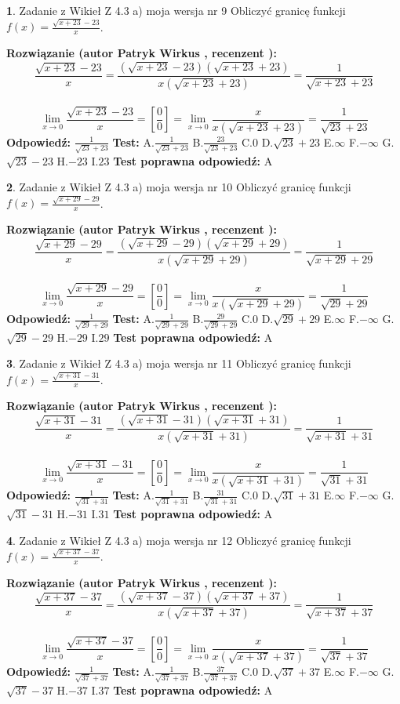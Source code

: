 \documentclass[12pt, a4paper]{article}
\theoremstyle{definition} %
\newtheorem{zad}{}
\newcommand{\zadStart}[1]{\begin{zad}#1\newline}
\newcommand{\zadStop}{\end{zad}}
\newcommand{\rozwStart}[2]{\noindent \textbf{Rozwiązanie (autor #1 , recenzent #2): }\newline}
\newcommand{\rozwStop}{\newline}
\newcommand{\odpStart}{\noindent \textbf{Odpowiedź:}\newline}
\newcommand{\odpStop}{\newline}
\newcommand{\testStart}{\noindent \textbf{Test:}\newline}
\newcommand{\testStop}{\newline}
\newcommand{\kluczStart}{\noindent \textbf{Test poprawna odpowiedź:}\newline}
\newcommand{\kluczStop}{\newline}
\begin{document}
\zadStart{Zadanie z Wikieł Z 4.3 a) moja wersja nr 9}
Obliczyć granicę funkcji $f(x)=\frac{\sqrt{x+23}-23}{x}$.
\zadStop
\rozwStart{Patryk Wirkus}{}
$$\frac{\sqrt{x+23}-23}{x}=\frac{(\sqrt{x+23}-23)(\sqrt{x+23}+23)}{x(\sqrt{x+23}+23)}=\frac{1}{\sqrt{x+23}+23}$$
\\
$$\lim\limits_{x\to0}\frac{\sqrt{x+23}-23}{x}=[\frac{0}{0}]=
\lim\limits_{x\to0}\frac{x}{x(\sqrt{x+23}+23)} = \frac{1}{\sqrt{23}+23}$$
\rozwStop
\odpStart
$\frac{1}{\sqrt{23}+23}$
\odpStop
\testStart
A.$\frac{1}{\sqrt{23}+23}$
B.$\frac{23}{\sqrt{23}+23}$
C.$0$
D.$\sqrt{23}+23$
E.$\infty$
F.$-\infty$
G.$\sqrt{23}-23$
H.$-23$
I.$23$
\testStop
\kluczStart
A
\kluczStop



\zadStart{Zadanie z Wikieł Z 4.3 a) moja wersja nr 10}
Obliczyć granicę funkcji $f(x)=\frac{\sqrt{x+29}-29}{x}$.
\zadStop
\rozwStart{Patryk Wirkus}{}
$$\frac{\sqrt{x+29}-29}{x}=\frac{(\sqrt{x+29}-29)(\sqrt{x+29}+29)}{x(\sqrt{x+29}+29)}=\frac{1}{\sqrt{x+29}+29}$$
\\
$$\lim\limits_{x\to0}\frac{\sqrt{x+29}-29}{x}=[\frac{0}{0}]=
\lim\limits_{x\to0}\frac{x}{x(\sqrt{x+29}+29)} = \frac{1}{\sqrt{29}+29}$$
\rozwStop
\odpStart
$\frac{1}{\sqrt{29}+29}$
\odpStop
\testStart
A.$\frac{1}{\sqrt{29}+29}$
B.$\frac{29}{\sqrt{29}+29}$
C.$0$
D.$\sqrt{29}+29$
E.$\infty$
F.$-\infty$
G.$\sqrt{29}-29$
H.$-29$
I.$29$
\testStop
\kluczStart
A
\kluczStop



\zadStart{Zadanie z Wikieł Z 4.3 a) moja wersja nr 11}
Obliczyć granicę funkcji $f(x)=\frac{\sqrt{x+31}-31}{x}$.
\zadStop
\rozwStart{Patryk Wirkus}{}
$$\frac{\sqrt{x+31}-31}{x}=\frac{(\sqrt{x+31}-31)(\sqrt{x+31}+31)}{x(\sqrt{x+31}+31)}=\frac{1}{\sqrt{x+31}+31}$$
\\
$$\lim\limits_{x\to0}\frac{\sqrt{x+31}-31}{x}=[\frac{0}{0}]=
\lim\limits_{x\to0}\frac{x}{x(\sqrt{x+31}+31)} = \frac{1}{\sqrt{31}+31}$$
\rozwStop
\odpStart
$\frac{1}{\sqrt{31}+31}$
\odpStop
\testStart
A.$\frac{1}{\sqrt{31}+31}$
B.$\frac{31}{\sqrt{31}+31}$
C.$0$
D.$\sqrt{31}+31$
E.$\infty$
F.$-\infty$
G.$\sqrt{31}-31$
H.$-31$
I.$31$
\testStop
\kluczStart
A
\kluczStop



\zadStart{Zadanie z Wikieł Z 4.3 a) moja wersja nr 12}
Obliczyć granicę funkcji $f(x)=\frac{\sqrt{x+37}-37}{x}$.
\zadStop
\rozwStart{Patryk Wirkus}{}
$$\frac{\sqrt{x+37}-37}{x}=\frac{(\sqrt{x+37}-37)(\sqrt{x+37}+37)}{x(\sqrt{x+37}+37)}=\frac{1}{\sqrt{x+37}+37}$$
\\
$$\lim\limits_{x\to0}\frac{\sqrt{x+37}-37}{x}=[\frac{0}{0}]=
\lim\limits_{x\to0}\frac{x}{x(\sqrt{x+37}+37)} = \frac{1}{\sqrt{37}+37}$$
\rozwStop
\odpStart
$\frac{1}{\sqrt{37}+37}$
\odpStop
\testStart
A.$\frac{1}{\sqrt{37}+37}$
B.$\frac{37}{\sqrt{37}+37}$
C.$0$
D.$\sqrt{37}+37$
E.$\infty$
F.$-\infty$
G.$\sqrt{37}-37$
H.$-37$
I.$37$
\testStop
\kluczStart
A
\kluczStop
\end{document}

